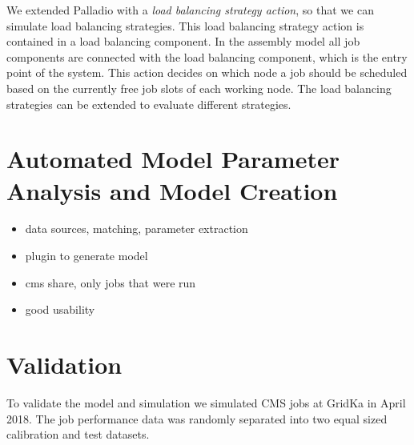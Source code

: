 \documentclass[runningheads,a4paper]{llncs}[2017/09/04]
\begin{document}
We extended Palladio with a \textit{load balancing strategy action}, so that we can simulate load balancing strategies.
This load balancing strategy action is contained in a load balancing component.
In the assembly model all job components are connected with the load balancing component, which is the entry point of the system.
This action decides on which node a job should be scheduled based on the currently free job slots of each working node. The load balancing strategies can be extended to evaluate different strategies.



\section{Automated Model Parameter Analysis and Model Creation}
\label{sec:param}
\begin{itemize}
	\item data sources, matching, parameter extraction
	\item plugin to generate model
	\item cms share, only jobs that were run
	\item good usability
\end{itemize}

\section{Validation}
\label{validation}
To validate the model and simulation we simulated CMS jobs at GridKa in April 2018.
The job performance data was randomly separated into two equal sized calibration and test datasets.
\end{document}
